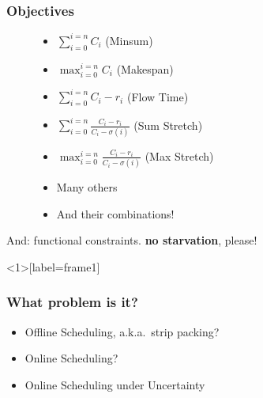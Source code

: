 \documentclass{beamer}
\begin{document}
\label{sub:objectives}
\begin{frame}
  \frametitle{Objectives}
  \centering
  \begin{figure}
  \begin{itemize}
    \item $\sum_{i=0}^{i=n} C_i$ (Minsum)
    \item $\max_{i=0}^{i=n} C_i$ (Makespan)
    \item $\sum_{i=0}^{i=n} C_i-r_i$ (Flow Time)
    \item $\sum_{i=0}^{i=n} \frac{C_i-r_i}{C_i-\sigma(i)}$ (Sum Stretch)
    \item $\max_{i=0}^{i=n} \frac{C_i-r_i}{C_i-\sigma(i)}$ (Max Stretch)
    \item Many others
    \item And their combinations!
  \end{itemize}
  \end{figure}
  \pause
  And: functional constraints. \textbf{no starvation}, please!
\end{frame}


\begin{frame}<1>[label=frame1]
  \frametitle{What problem is it?}
  \begin{itemize}
    \item<1-> Offline Scheduling, a.k.a.\ strip packing? \onslide<2->{-- no}
    \item<3-> Online Scheduling? 
    \item<5-> Online Scheduling under Uncertainty 
  \end{itemize}
\end{frame}
\end{document}
